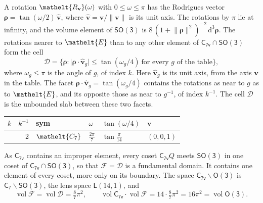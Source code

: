 \documentclass[10pt,a4paper]{article}
\numberwithin{equation}{section}
\newcommand{\eltfont}[1]{{\let\sigma\eltsigma\mathelt{#1}}}
\newcommand{\grp}[1]{\mathsf{#1}}
\newcommand{\cls}[1]{\eltfont{#1}}
\newcommand{\elt}[1]{\eltfont{#1}}
\newcommand{\dirvec}[3]{(#1, #2, #3)}
\newcommand{\unitaxis}{\hat{\mathbf{v}}}
\newcommand{\vv}{\mathbf{v}}
\newcommand{\diff}{\mathrm{d}}
\newcommand{\vol}{\operatorname{vol}}
\newcommand{\rodrigues}{\boldsymbol{\rho}}
\newcommand{\fcell}{\mathcal{D}}
\newcommand{\fdomain}{\mathcal{F}}
\newcommand{\lensspace}[2]{\mathsf{L}(#1, #2)}
\begin{document}
\leavevmode\label{n:vector.rodrigues}\label{n:vector.unitaxis}A rotation $\elt{R_{\vv}}(\omega)$ with $0 \le \omega \le \pi$ has the Rodrigues vector $\rodrigues = \tan(\omega/2)\,\unitaxis$, where $\unitaxis = \vv/\lVert\vv\rVert$ is its unit axis. The rotations by $\pi$ lie at infinity, and the volume element of \href{SO3.pdf}{$\grp{SO(3)}$} is $8\,(1 + \lVert\rodrigues\rVert^2)^{-2}\,\diff^3\rodrigues$.
\leavevmode\label{n:set.cell}The rotations nearer to $\elt{E}$ than to any other element of $\grp{C_{7v}} \cap \grp{SO(3)}$ form the cell
\begin{equation}\label{e:cell}\fcell = \bigl\{\rodrigues : \lvert\rodrigues\cdot\unitaxis_g\rvert \le \tan(\omega_g/4)\ \text{for every $g$ of the table}\bigr\},\end{equation}
where $\omega_g \le \pi$ is the angle of $g$, of index $k$. Here $\unitaxis_g$ is its unit axis, from the axis $\vv$ in the table. The facet $\rodrigues\cdot\unitaxis_g = \tan(\omega_g/4)$ contains the rotations as near to $g$ as to $\elt{E}$, and its opposite those as near to $g^{-1}$, of index $k^{-1}$. The cell $\fcell$ is the unbounded slab between these two facets.
{\small{\renewcommand{\arraystretch}{1.3}\begin{longtable}{@{}rrllll@{}}\toprule
$k$ & $k^{-1}$ & sym & $\omega$ & $\tan(\omega/4)$ & $\vv$\\\midrule\endhead
\bottomrule\endfoot\endlastfoot
1 & 2 & $\cls{C_{7}}$ & $\tfrac{2\pi}{7}$ & $\tan\tfrac{\pi}{14}$ & $\dirvec{0}{0}{1}$\\
\bottomrule\end{longtable}}}

\leavevmode\label{n:set.fundamental}As $\grp{C_{7v}}$ contains an improper element, every coset $\grp{C_{7v}}Q$ meets \href{SO3.pdf}{$\grp{SO(3)}$} in one coset of $\grp{C_{7v}} \cap \grp{SO(3)}$, so that $\fdomain = \fcell$ is a fundamental domain. It contains one element of every coset, more only on its boundary.
\leavevmode\label{n:set.lens}The space $\grp{C_{7v}}\backslash\grp{O(3)}$ is $\grp{C_{7}}\backslash\grp{SO(3)}$, the lens space $\lensspace{14}{1}$, and
\begin{equation}\label{e:volume}\vol\fdomain = \vol\fcell = \tfrac{8}{7}\pi^2,\qquad \vol\grp{C_{7v}}\cdot\vol\fdomain = 14\cdot \tfrac{8}{7}\pi^2 = 16\pi^2 = \vol\grp{O(3)}.\end{equation}
\end{document}
